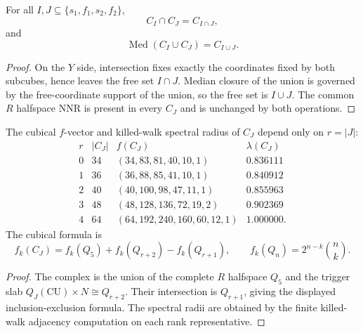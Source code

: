 \begin{theorem}
\label{thm:philosophy-boolean-lattice-operations}
For all $I,J\subseteq\{s_{1},f_{1},s_{2},f_{2}\}$,
$$
  C_{I}\cap C_{J}=C_{I\cap J},
$$
and
$$
  \operatorname{Med}(C_{I}\cup C_{J})=C_{I\cup J}.
$$
\end{theorem}
\begin{proof}
On the $Y$ side, intersection fixes exactly the coordinates fixed by
both subcubes, hence leaves the free set $I\cap J$. Median closure of
the union is governed by the free-coordinate support of the union, so
the free set is $I\cup J$. The common $R$ halfspace $\mathrm{NNR}$ is
present in every $C_{J}$ and is unchanged by both operations.
\end{proof}

\begin{theorem}
\label{thm:philosophy-trigger-lattice-rank-table}
The cubical $f$-vector and killed-walk spectral radius of $C_{J}$ depend
only on $r=|J|$:
$$
\begin{array}{c|r|l|r}
  r & |C_{J}| & f(C_{J}) & \lambda(C_{J})\\
  \hline
  0 & 34 & (34,83,81,40,10,1) & 0.836111\\
  1 & 36 & (36,88,85,41,10,1) & 0.840912\\
  2 & 40 & (40,100,98,47,11,1) & 0.855963\\
  3 & 48 & (48,128,136,72,19,2) & 0.902369\\
  4 & 64 & (64,192,240,160,60,12,1) & 1.000000.
\end{array}
$$
The cubical formula is
$$
  f_{k}(C_{J})
  =
  f_{k}(Q_{5})+f_{k}(Q_{r+2})-f_{k}(Q_{r+1}),
  \qquad
  f_{k}(Q_{n})=2^{n-k}\binom{n}{k}.
$$
\end{theorem}
\begin{proof}
The complex is the union of the complete $R$ halfspace $Q_{5}$ and the
trigger slab $Q_{J}(\mathrm{CU})\times N\cong Q_{r+2}$. Their
intersection is $Q_{r+1}$, giving the displayed inclusion-exclusion
formula. The spectral radii are obtained by the finite killed-walk
adjacency computation on each rank representative.
\end{proof}


